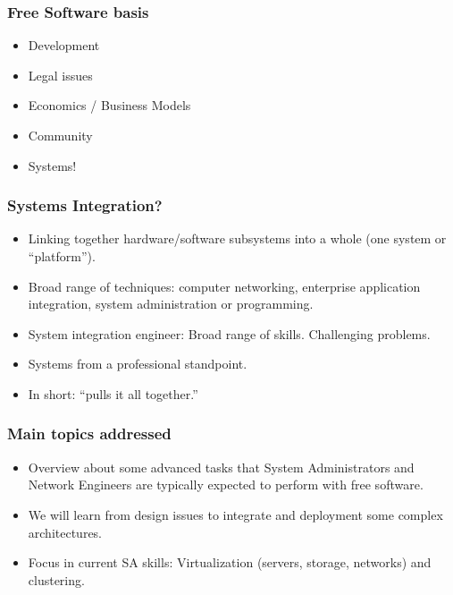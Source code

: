 \documentclass{beamer}
\begin{document}

\begin{frame}
\frametitle{Free Software basis}

\pause
\begin{itemize}
    \item Development
\pause
    \item Legal issues
\pause
    \item Economics / Business Models
\pause
    \item Community
\pause
    \item \alert{Systems!} 
\end{itemize}

\end{frame}



\begin{frame}
\frametitle{Systems Integration?}

\begin{itemize}
   \item Linking together hardware/software subsystems into a whole (one system or ``\alert{platform}'').
   \item Broad range of techniques: computer networking, enterprise application integration, system administration or programming.
   \item System integration engineer: Broad range of skills. Challenging problems.
   \item Systems from a professional standpoint. 
   \item In short: ``\alert{pulls it all together.}'' 
\end{itemize}

\end{frame}




\begin{frame}
\frametitle{Main topics addressed}

\begin{itemize}
   \item Overview about some advanced tasks that System Administrators and Network Engineers are typically expected to perform with free software. 
   \item We will learn from design issues to integrate and deployment some complex architectures.
   \item Focus in current SA skills: \alert{Virtualization} (servers, storage, networks) and \alert{clustering}.   
\end{itemize}

\end{frame}
\end{document}
